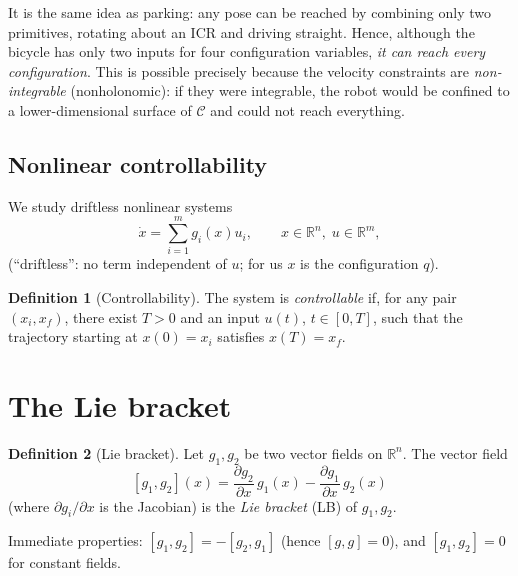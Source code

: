\documentclass[11pt,a4paper]{article}
\newcommand{\R}{\mathbb{R}}
\newcommand{\LB}[2]{[#1,#2]}
\theoremstyle{definition}
\newtheorem{definition}{Definition}[section]
\theoremstyle{plain}
\theoremstyle{remark}
\begin{document}
\begin{intuition}
It is the same idea as parking: any pose can be reached by combining only two primitives, rotating about an ICR and driving straight. Hence, although the bicycle has only two inputs for four configuration variables, \emph{it can reach every configuration}. This is possible precisely because the velocity constraints are \emph{non-integrable} (nonholonomic): if they were integrable, the robot would be confined to a lower-dimensional surface of $\mathcal C$ and could not reach everything.
\end{intuition}

\subsection{Nonlinear controllability}

We study driftless nonlinear systems
\[
\dot x=\sum_{i=1}^m g_i(x)u_i,\qquad x\in\R^n,\; u\in\R^m,
\]
(``driftless'': no term independent of $u$; for us $x$ is the configuration $q$).

\begin{definition}[Controllability]
The system is \emph{controllable} if, for any pair $(x_i,x_f)$, there exist $T>0$ and an input $u(t)$, $t\in[0,T]$, such that the trajectory starting at $x(0)=x_i$ satisfies $x(T)=x_f$.
\end{definition}

\section{The Lie bracket}

\begin{definition}[Lie bracket]
Let $g_1,g_2$ be two vector fields on $\R^n$. The vector field
\[
\LB{g_1}{g_2}(x)=\frac{\partial g_2}{\partial x}\,g_1(x)-\frac{\partial g_1}{\partial x}\,g_2(x)
\]
(where $\partial g_i/\partial x$ is the Jacobian) is the \emph{Lie bracket} (LB) of $g_1,g_2$.
\end{definition}

Immediate properties: $\LB{g_1}{g_2}=-\LB{g_2}{g_1}$ (hence $\LB{g}{g}=0$), and $\LB{g_1}{g_2}=0$ for constant fields.
\end{document}
